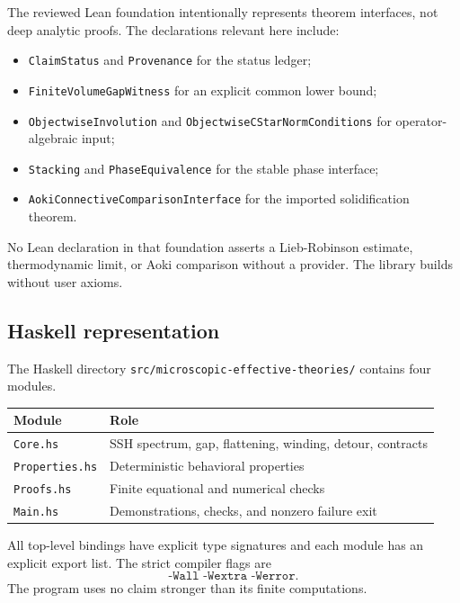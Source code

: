 \documentclass[12pt]{article}
\theoremstyle{definition}
\theoremstyle{remark}
\begin{document}
The reviewed Lean foundation intentionally represents theorem interfaces, not
deep analytic proofs.
The declarations relevant here include:

\begin{itemize}
  \item \texttt{ClaimStatus} and \texttt{Provenance} for the status ledger;
  \item \texttt{FiniteVolumeGapWitness} for an explicit common lower bound;
  \item \texttt{ObjectwiseInvolution} and
  \texttt{ObjectwiseCStarNormConditions} for operator-algebraic input;
  \item \texttt{Stacking} and \texttt{PhaseEquivalence} for the stable phase
  interface;
  \item \texttt{AokiConnectiveComparisonInterface} for the imported
  solidification theorem.
\end{itemize}

No Lean declaration in that foundation asserts a Lieb-Robinson estimate,
thermodynamic limit, or Aoki comparison without a provider.
The library builds without user axioms.

\subsection{Haskell representation}

The Haskell directory
\texttt{src/microscopic-effective-theories/} contains four modules.

\begin{center}
\begin{tabular}{ll}
\toprule
Module & Role \\
\midrule
\texttt{Core.hs} & SSH spectrum, gap, flattening, winding, detour, contracts \\
\texttt{Properties.hs} & Deterministic behavioral properties \\
\texttt{Proofs.hs} & Finite equational and numerical checks \\
\texttt{Main.hs} & Demonstrations, checks, and nonzero failure exit \\
\bottomrule
\end{tabular}
\end{center}

All top-level bindings have explicit type signatures and each module has an
explicit export list.
The strict compiler flags are
\[
\texttt{-Wall -Wextra -Werror}.
\]
The program uses no claim stronger than its finite computations.
\end{document}
